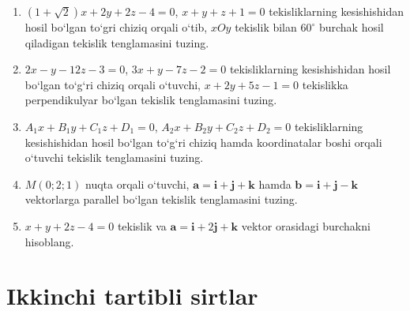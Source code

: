 \begin{enumerate}
	\item $(1+\sqrt{2})x+2y+2z-4=0$, $x+y+z+1=0$ tekisliklarning kesishishidan hosil bo`lgan to`gri chiziq orqali o`tib, $xOy$ tekislik bilan $60^\circ$ burchak hosil qiladigan tekislik tenglamasini tuzing.
	\item $2x-y-12z-3=0$, $3x+y-7z-2=0$ tekisliklarning kesishishidan hosil bo`lgan to`g`ri chiziq orqali o`tuvchi, $x+2y+5z-1=0$ tekislikka perpendikulyar bo`lgan tekislik tenglamasini tuzing.
	\item $A_1x+B_1y+C_1z+D_1=0$, $A_2x+B_2y+C_2z+D_2=0$ tekisliklarning kesishishidan hosil bo`lgan to`g`ri chiziq hamda koordinatalar boshi orqali o`tuvchi tekislik tenglamasini tuzing.
	\item $M(0;2;1)$ nuqta orqali o`tuvchi, $\textbf{a}=\textbf{i}+\textbf{j}+\textbf{k}$ hamda $\textbf{b}=\textbf{i}+\textbf{j}-\textbf{k}$ vektorlarga parallel bo`lgan tekislik tenglamasini tuzing.
	\item $x+y+2z-4=0$ tekislik va $\textbf{a}=\textbf{i}+2\textbf{j}+\textbf{k}$ vektor orasidagi burchakni hisoblang.
	

	
	
\end{enumerate}
\section{Ikkinchi tartibli sirtlar}
